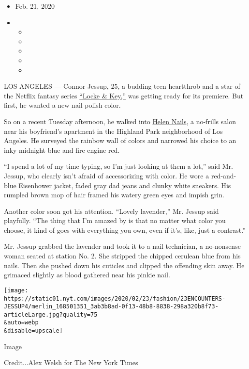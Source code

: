 \begin{itemize}
\item
  Feb. 21, 2020
\item
  \begin{itemize}
  \item
  \item
  \item
  \item
  \item
  \end{itemize}
\end{itemize}

LOS ANGELES --- Connor Jessup, 25, a budding teen heartthrob and a star
of the Netflix fantasy series
\href{https://www.netflix.com/title/80241239}{``Locke \& Key,''} was
getting ready for its premiere. But first, he wanted a new nail polish
color.

So on a recent Tuesday afternoon, he walked into
\href{https://www.instagram.com/helennailssalon/?hl=en}{Helen Nails}, a
no-frills salon near his boyfriend's apartment in the Highland Park
neighborhood of Los Angeles. He surveyed the rainbow wall of colors and
narrowed his choice to an inky midnight blue and fire engine red.

``I spend a lot of my time typing, so I'm just looking at them a lot,''
said Mr. Jessup, who clearly isn't afraid of accessorizing with color.
He wore a red-and-blue Eisenhower jacket, faded gray dad jeans and
clunky white sneakers. His rumpled brown mop of hair framed his watery
green eyes and impish grin.

Another color soon got his attention. ``Lovely lavender,'' Mr. Jessup
said playfully. ``The thing that I'm amazed by is that no matter what
color you choose, it kind of goes with everything you own, even if it's,
like, just a contrast.''

Mr. Jessup grabbed the lavender and took it to a nail technician, a
no-nonsense woman seated at station No. 2. She stripped the chipped
cerulean blue from his nails. Then she pushed down his cuticles and
clipped the offending skin away. He grimaced slightly as blood gathered
near his pinkie nail.

\texttt{[image: https://static01.nyt.com/images/2020/02/23/fashion/23ENCOUNTERS-JESSUP4/merlin\_168501351\_3ab3b8ad-0f13-48b8-8838-298a320b8f73-articleLarge.jpg?quality=75\\\&auto=webp\\\&disable=upscale]}

Image

Credit...Alex Welsh for The New York Times


